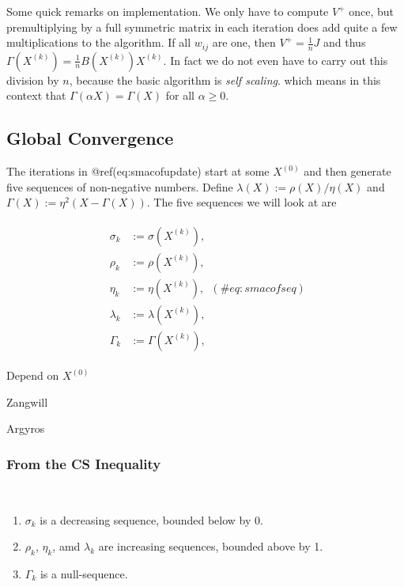 \documentclass[
  12pt,
  letterpaper,
  DIV=11,
  numbers=noendperiod]{scrreprt}
\theoremstyle{remark}
\begin{document}
Some quick remarks on implementation. We only have to compute \(V^+\)
once, but premultiplying by a full symmetric matrix in each iteration
does add quite a few multiplications to the algorithm. If all \(w_{ij}\)
are one, then \(V^+=\frac{1}{n}J\) and thus
\(\Gamma(X^{(k)})=\frac{1}{n}B(X^{(k)})X^{(k)}\). In fact we do not even
have to carry out this division by \(n\), because the basic algorithm is
\emph{self scaling}. which means in this context that
\(\Gamma(\alpha X)=\Gamma(X)\) for all \(\alpha\geq 0\).

\subsection{Global Convergence}\label{global-convergence}

The iterations in @ref(eq:smacofupdate) start at some \(X^{(0)}\) and
then generate five sequences of non-negative numbers. Define
\(\lambda(X):=\rho(X)/\eta(X)\) and \(\Gamma(X):=\eta^2(X-\Gamma(X))\).
The five sequences we will look at are

\begin{align}
\begin{split}
\sigma_k&:=\sigma(X^{(k)}),\\
\rho_k&:=\rho(X^{(k)}),\\
\eta_k&:=\eta(X^{(k)}),\\
\lambda_k&:=\lambda(X^{(k)}),\\
\Gamma_k&:=\Gamma(X^{(k)}),
\end{split}
(\#eq:smacofseq)
\end{align}

Depend on \(X^{(0)}\)

Zangwill

Argyros

\subsubsection{From the CS Inequality}\label{from-the-cs-inequality}

\label{smacoffunc}
~

\begin{enumerate}
\def\labelenumi{\arabic{enumi}.}
\item
  \(\sigma_k\) is a decreasing sequence, bounded below by 0.
\item
  \(\rho_k\), \(\eta_k\), amd \(\lambda_k\) are increasing sequences,
  bounded above by 1.
\item
  \(\Gamma_k\) is a null-sequence.
\end{enumerate}
\end{document}
